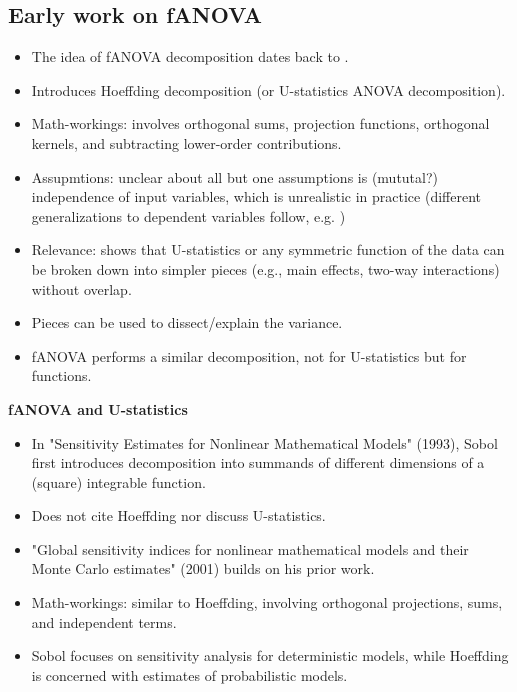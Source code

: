 
\subsection*{Early work on fANOVA}
\begin{itemize}
    \item The idea of fANOVA decomposition dates back to \cite{hoeffding_class_1948}.
    \item Introduces Hoeffding decomposition (or U-statistics ANOVA decomposition).
    \item Math-workings: involves orthogonal sums, projection functions, orthogonal kernels, and subtracting lower-order contributions.
    \item Assupmtions: unclear about all but one assumptions is (mututal?) independence of input variables, which is unrealistic in practice (different generalizations to dependent variables follow, e.g. \cite{il_idrissi_hoeffding_2025})
    \item Relevance: shows that U-statistics or any symmetric function of the data can be broken down into simpler pieces (e.g., main effects, two-way interactions) without overlap.
    \item Pieces can be used to dissect/explain the variance.
    \item fANOVA performs a similar decomposition, not for U-statistics but for functions.
\end{itemize}
\textbf{fANOVA and U-statistics}


\begin{itemize}
    \item In "Sensitivity Estimates for Nonlinear Mathematical Models" (1993), Sobol first introduces decomposition into summands of different dimensions of a (square) integrable function.
    \item Does not cite Hoeffding nor discuss U-statistics.
    \item "Global sensitivity indices for nonlinear mathematical models and their Monte Carlo estimates" (2001) builds on his prior work.
    \item Math-workings: similar to Hoeffding, involving orthogonal projections, sums, and independent terms.
    \item Sobol focuses on sensitivity analysis for deterministic models, while Hoeffding is concerned with estimates of probabilistic models.
\end{itemize}

